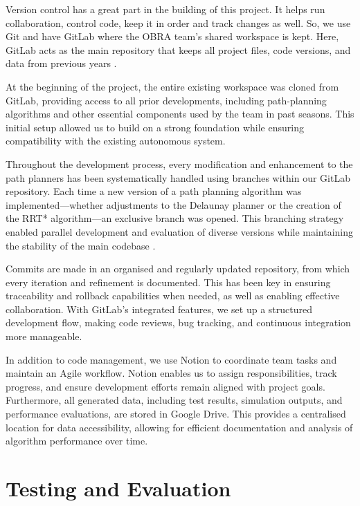 \documentclass[a4paper,11pt]{report}
\begin{document}
Version control has a great part in the building of this project. It helps run collaboration,
control code, keep it in order and track changes as well. So, we use Git and
have GitLab where the OBRA team's shared workspace is kept. Here, GitLab acts as the main repository
that keeps all project files, code versions, and data from previous years \cite{reference18}.

At the beginning of the project, the entire existing workspace was cloned from GitLab, 
providing access to all prior developments, including path-planning algorithms and other essential 
components used by the team in past seasons. This initial setup allowed us to build on a strong foundation 
while ensuring compatibility with the existing autonomous system.

Throughout the development process, every modification and enhancement to the path planners 
has been systematically handled using branches within our GitLab repository. Each time a new version 
of a path planning algorithm was implemented—whether adjustments to the Delaunay planner or the creation of the RRT* algorithm—an exclusive branch was opened. 
This branching strategy enabled parallel development and evaluation of diverse versions while maintaining the stability of the main codebase \cite{reference18}.

Commits are made in an organised and regularly updated repository, from which every iteration and 
refinement is documented. This has been key in ensuring traceability and rollback capabilities when needed, 
as well as enabling effective collaboration. With GitLab’s integrated features, we set up a structured 
development flow, making code reviews, bug tracking, and continuous integration more manageable.

In addition to code management, we use Notion to coordinate team tasks and maintain an Agile workflow. 
Notion enables us to assign responsibilities, track progress, and ensure development efforts remain aligned 
with project goals. Furthermore, all generated data, including test results, simulation outputs, and performance 
evaluations, are stored in Google Drive. This provides a centralised location for data accessibility, allowing for 
efficient documentation and analysis of algorithm performance over time.


\newpage

\chapter{Testing and Evaluation}
\end{document}
